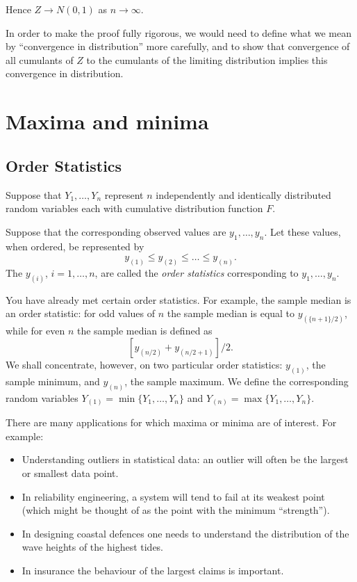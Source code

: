 \documentclass[]{book}
\providecommand{\tightlist}{%
  \setlength{\itemsep}{0pt}\setlength{\parskip}{0pt}}
\theoremstyle{definition}
\theoremstyle{definition}
\theoremstyle{definition}
\theoremstyle{remark}
\begin{document}
Hence \(Z \rightarrow N(0, 1)\) as \(n \rightarrow \infty\).

In order to make the proof fully rigorous, we would need to define what
we mean by ``convergence in distribution'' more carefully, and to show
that convergence of all cumulants of \(Z\) to the cumulants of the
limiting distribution implies this convergence in distribution.

\chapter{Maxima and minima}\label{maxima-and-minima}

\section{Order Statistics}\label{order-statistics}

Suppose that \(Y_1, \ldots, Y_n\) represent \(n\) independently and
identically distributed random variables each with cumulative
distribution function \(F\).

Suppose that the corresponding observed values are \(y_1, \ldots, y_n\).
Let these values, when ordered, be represented by
\[y_{(1)} \leq y_{(2)} \leq \ldots \leq y_{(n)}.\] The \(y_{(i)}\),
\(i = 1, \ldots, n\), are called the \emph{order statistics}
corresponding to \(y_1, \ldots, y_n\).

You have already met certain order statistics. For example, the sample
median is an order statistic: for odd values of \(n\) the sample median
is equal to \(y_{(\{n+1\}/2)}\), while for even \(n\) the sample median
is defined as \[ [y_{(n/2)} + y_{(n/2+1)}]/2.\] We shall concentrate,
however, on two particular order statistics: \(y_{(1)}\), the sample
minimum, and \(y_{(n)}\), the sample maximum. We define the
corresponding random variables \(Y_{(1)} = \min\{Y_1, \ldots, Y_n\}\)
and \(Y_{(n)} = \max\{Y_1 , \ldots, Y_n \}\).

There are many applications for which maxima or minima are of interest.
For example:

\begin{itemize}
\tightlist
\item
  Understanding outliers in statistical data: an outlier will often be
  the largest or smallest data point.
\item
  In reliability engineering, a system will tend to fail at its weakest
  point (which might be thought of as the point with the minimum
  ``strength'').
\item
  In designing coastal defences one needs to understand the distribution
  of the wave heights of the highest tides.
\item
  In insurance the behaviour of the largest claims is important.
\end{itemize}
\end{document}
